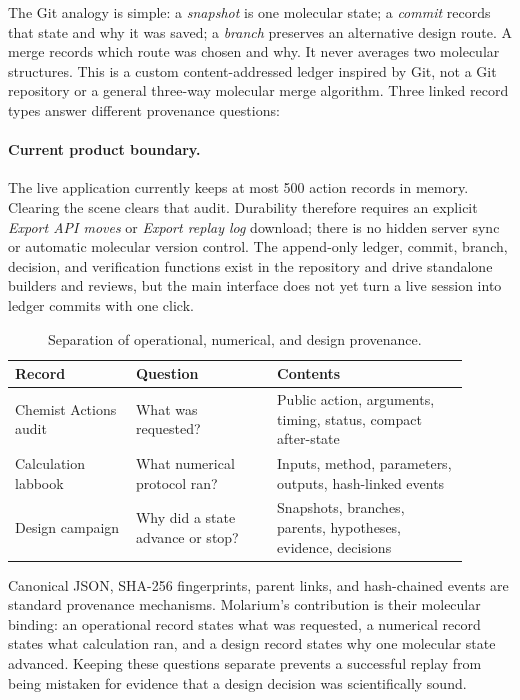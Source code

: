 The Git analogy is simple: a \emph{snapshot} is one molecular state; a
\emph{commit} records that state and why it was saved; a \emph{branch} preserves
an alternative design route. A merge records which route was chosen and why. It
never averages two molecular structures. This is a custom content-addressed
ledger inspired by Git, not a Git repository or a general three-way molecular
merge algorithm. Three linked record types answer different provenance
questions:

\paragraph{Current product boundary.}
The live application currently keeps at most 500 action records in memory.
Clearing the scene clears that audit. Durability therefore requires an explicit
\emph{Export API moves} or \emph{Export replay log} download; there is no hidden
server sync or automatic molecular version control. The append-only ledger,
commit, branch, decision, and verification functions exist in the repository and
drive standalone builders and reviews, but the main interface does not yet turn
a live session into ledger commits with one click.

\begin{table}[htbp]
  \centering
  \caption{Separation of operational, numerical, and design provenance.}
  \label{tab:design-records}
  \footnotesize
  \renewcommand{\arraystretch}{1.08}
  \begin{tabular}{@{}>{\raggedright\arraybackslash}p{0.24\linewidth}
                       >{\raggedright\arraybackslash}p{0.28\linewidth}
                       >{\raggedright\arraybackslash}p{0.38\linewidth}@{}}
    \toprule
    Record & Question & Contents \\
    \midrule
    Chemist Actions audit & What was requested? &
      Public action, arguments, timing, status, compact after-state \\
    Calculation labbook & What numerical protocol ran? &
      Inputs, method, parameters, outputs, hash-linked events \\
    Design campaign & Why did a state advance or stop? &
      Snapshots, branches, parents, hypotheses, evidence, decisions \\
    \bottomrule
  \end{tabular}
\end{table}

Canonical JSON, SHA-256 fingerprints, parent links, and hash-chained events are
standard provenance mechanisms. Molarium's contribution is their molecular
binding: an operational record states what was requested, a numerical record
states what calculation ran, and a design record states why one molecular state
advanced. Keeping these questions separate prevents a successful replay from
being mistaken for evidence that a design decision was scientifically sound.

